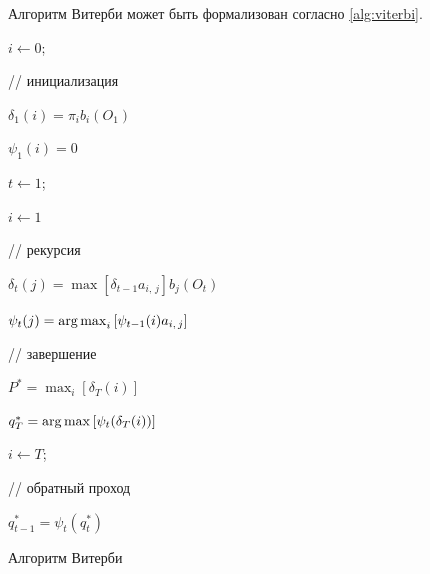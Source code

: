 Алгоритм Витерби может быть формализован согласно \ref{alg:viterbi}. 

\begin{algorithm}[H]
	\SetAlgoLined
	
	
	$i \leftarrow 0$;
	{
		// инициализация
		
		
		$\delta_1(i) = \pi_ib_i(O_1)$\;
		
		
		$\psi_1(i) = 0$\;
		
	}

	$t \leftarrow 1$; 
	{
		$i \leftarrow 1$\;
		{
			// рекурсия
			
			
			$\delta_t(j) = \max\left[\delta_{t - 1}a_{i,\,j}\right]b_j(O_t)$\;
			
			
			$\psi_t(j) = \operatorname*{arg\,max}_i\left[\psi_{t - 1}(i)a_{i,\,j}\right]$\;
			
		}
		
	}
	// завершение
	
	$P^{*} = \max_i\left[\delta_T(i)\right]$\;
	
	$q_T^* = \operatorname*{arg\,max}\left[\psi_t(\delta_T(i))\right]$\;
	
	$i \leftarrow T$;
	{
		// обратный проход
		
		
		$q_{t - 1}^* = \psi_t(q_{t}^*)$\;
		
	}
	 
	\caption{Алгоритм Витерби}
	\label{alg:viterbi}
	\end{algorithm}



